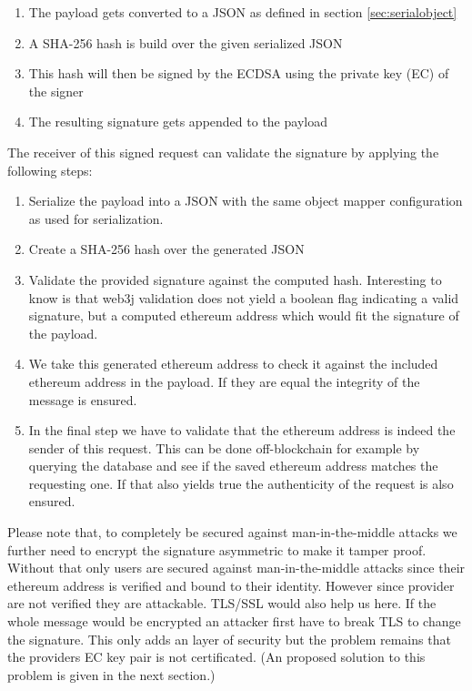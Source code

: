 \begin{enumerate}
\item The payload gets converted to a JSON as defined in section \ref{sec:serialobject}
\item A SHA-256 hash is build over the given serialized JSON
\item This hash will then be signed by the ECDSA using the private key (EC) of the signer
\item The resulting signature gets appended to the payload
\end{enumerate}

\noindent The receiver of this signed request can validate the signature by applying the following steps:

\begin{enumerate}
\item Serialize the payload into a JSON with the same object mapper configuration as used for serialization.
\item Create a SHA-256 hash over the generated JSON
\item Validate the provided signature against the computed hash. Interesting to know is that web3j validation does not yield a boolean flag indicating a valid signature, but a computed ethereum address which would fit the signature of the payload. 
\item We take this generated ethereum address to check it against the included ethereum address in the payload. If they are equal the integrity of the message is ensured. 
\item In the final step we have to validate that the ethereum address is indeed the sender of this request. This can be done off-blockchain for example by querying the database and see if the saved ethereum address matches the requesting one. If that also yields true the authenticity of the request is also ensured. 
\end{enumerate}

Please note that, to completely be secured against man-in-the-middle attacks we further need to encrypt the  signature asymmetric to make it tamper proof. Without that only users are secured against man-in-the-middle attacks since their ethereum address is verified and bound to their identity. However since provider are not verified they are attackable. TLS/SSL would also help us here. If the whole message would be encrypted an attacker first have to break TLS to change the signature. This only adds an layer of security but the problem remains that the providers EC key pair is not certificated. 
(An proposed solution to this problem is given in the next section.)


